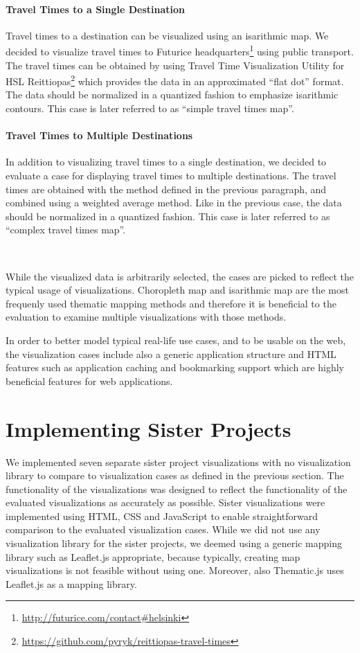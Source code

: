 \paragraph{Travel Times to a Single Destination}
Travel times to a destination can be visualized using an isarithmic map. We decided to visualize travel times to Futurice headquarters\footnote{\url{http://futurice.com/contact\#helsinki}} using public transport. The travel times can be obtained by using Travel Time Visualization Utility for HSL Reittiopas\footnote{\url{https://github.com/pyryk/reittiopas-travel-times}} which provides the data in an approximated ``flat dot'' format. The data should be normalized in a quantized fashion to emphasize isarithmic contours. This case is later referred to as ``simple travel times map''.

\paragraph{Travel Times to Multiple Destinations}
In addition to visualizing travel times to a single destination, we decided to evaluate a case for displaying travel times to multiple destinations. The travel times are obtained with the method defined in the previous paragraph, and combined using a weighted average method. Like in the previous case, the data should be normalized in a quantized fashion. This case is later referred to as ``complex travel times map''.

~

While the visualized data is arbitrarily selected, the cases are picked to reflect the typical usage of visualizations. Choropleth map and isarithmic map are the most frequenly used thematic mapping methods \citep[chap.~14-15]{slocum_thematic_2014} and therefore it is beneficial to the evaluation to examine multiple visualizations with those methods.

In order to better model typical real-life use cases, and to be usable on the web, the visualization cases include also a generic application structure and HTML features such as application caching and bookmarking support which are highly beneficial features for web applications.

\section{Implementing Sister Projects}

We implemented seven separate sister project visualizations with no visualization library to compare to visualization cases as defined in the previous section. The functionality of the visualizations was designed to reflect the functionality of the evaluated visualizations as accurately as possible. Sister visualizations were implemented using HTML, CSS and JavaScript to enable straightforward comparison to the evaluated visualization cases. While we did not use any visualization library for the sister projects, we deemed using a generic mapping library such as Leaflet.js appropriate, because typically, creating map visualizations is not feasible without using one. Moreover, also Thematic.js uses Leaflet.js as a mapping library.

